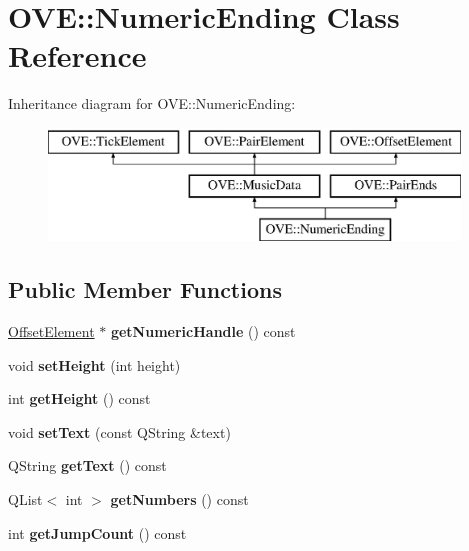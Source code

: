 \hypertarget{class_o_v_e_1_1_numeric_ending}{}\section{O\+VE\+:\+:Numeric\+Ending Class Reference}
\label{class_o_v_e_1_1_numeric_ending}
Inheritance diagram for O\+VE\+:\+:Numeric\+Ending\+:\begin{figure}[H]
\begin{center}
\leavevmode
\includegraphics[height=3.000000cm]{class_o_v_e_1_1_numeric_ending}
\end{center}
\end{figure}
\subsection*{Public Member Functions}
\begin{DoxyCompactItemize}
\item 
\mbox{\label{class_o_v_e_1_1_numeric_ending_a347963b5f7558c473dfca34c3fe43745}} 
\hyperlink{class_o_v_e_1_1_offset_element}{Offset\+Element} $\ast$ {\bfseries get\+Numeric\+Handle} () const
\item 
\mbox{\label{class_o_v_e_1_1_numeric_ending_a3e4b45cd55b68a7e6b3aae546c067c1c}} 
void {\bfseries set\+Height} (int height)
\item 
\mbox{\label{class_o_v_e_1_1_numeric_ending_ade8d528f8386b65c7168dccb5bd53589}} 
int {\bfseries get\+Height} () const
\item 
\mbox{\label{class_o_v_e_1_1_numeric_ending_ac80a7c0cfcf827e573c8edf0c4a96e48}} 
void {\bfseries set\+Text} (const Q\+String \&text)
\item 
\mbox{\label{class_o_v_e_1_1_numeric_ending_a641579d3f9468c0cf53245f50a4c4f10}} 
Q\+String {\bfseries get\+Text} () const
\item 
\mbox{\label{class_o_v_e_1_1_numeric_ending_a16ed524e99ddb576f3d12b6bdebb00c8}} 
Q\+List$<$ int $>$ {\bfseries get\+Numbers} () const
\item 
\mbox{\label{class_o_v_e_1_1_numeric_ending_aae1c98227997f03de01be5743fb912bc}} 
int {\bfseries get\+Jump\+Count} () const
\end{DoxyCompactItemize}
